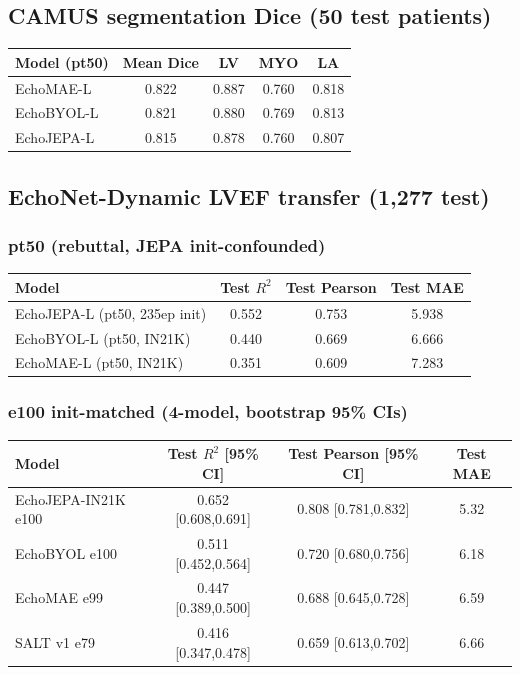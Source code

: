 \documentclass{article}
\begin{document}
\subsection{CAMUS segmentation Dice (50 test patients)}\label{sec:camus_seg}

\begin{center}
\begin{tabular}{lcccc}
\toprule
Model (pt50) & Mean Dice & LV & MYO & LA \\
\midrule
EchoMAE-L  & 0.822 & 0.887 & 0.760 & 0.818 \\
EchoBYOL-L & 0.821 & 0.880 & 0.769 & 0.813 \\
EchoJEPA-L & 0.815 & 0.878 & 0.760 & 0.807 \\
\bottomrule
\end{tabular}
\end{center}

\subsection{EchoNet-Dynamic LVEF transfer (1{,}277 test)}\label{sec:end_lvef}

\subsubsection{pt50 (rebuttal, JEPA init-confounded)}

\begin{center}
\begin{tabular}{lccc}
\toprule
Model & Test $R^2$ & Test Pearson & Test MAE \\
\midrule
EchoJEPA-L (pt50, 235ep init) & 0.552 & 0.753 & 5.938 \\
EchoBYOL-L (pt50, IN21K)      & 0.440 & 0.669 & 6.666 \\
EchoMAE-L  (pt50, IN21K)      & 0.351 & 0.609 & 7.283 \\
\bottomrule
\end{tabular}
\end{center}

\subsubsection{e100 init-matched (4-model, bootstrap 95\% CIs)}

\begin{center}
\begin{tabular}{lccc}
\toprule
Model & Test $R^2$ [95\% CI] & Test Pearson [95\% CI] & Test MAE \\
\midrule
EchoJEPA-IN21K e100 & 0.652 [0.608,0.691] & 0.808 [0.781,0.832] & 5.32 \\
EchoBYOL e100       & 0.511 [0.452,0.564] & 0.720 [0.680,0.756] & 6.18 \\
EchoMAE e99         & 0.447 [0.389,0.500] & 0.688 [0.645,0.728] & 6.59 \\
SALT v1 e79         & 0.416 [0.347,0.478] & 0.659 [0.613,0.702] & 6.66 \\
\bottomrule
\end{tabular}
\end{center}
\end{document}
